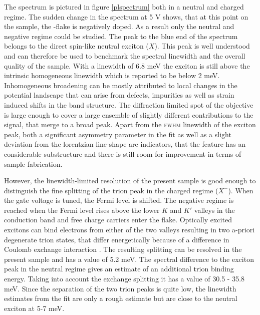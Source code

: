 The \pl spectrum is pictured in figure \ref{plspectrum} both in a neutral and charged regime. The sudden change in the spectrum at 5 V shows, that at this point on the sample, the \tmd-flake is negatively doped. As a result only the neutral and negative regime could be studied. The peak to the blue end of the spectrum belongs to the direct spin-like neutral exciton ($X$). This peak is well understood and can therefore be used to benchmark the spectral linewidth and the overall quality of the sample. With a linewidth of 6.8 meV the exciton is still above the intrinsic homogeneous linewidth which is reported to be below 2 meV\cite{moody_intrinsic_2015, ajayi_approaching_2017}. Inhomogeneous broadening can be mostly attributed to local changes in the potential landscape that can arise from defects, impurities as well as strain induced shifts in the band structure\cite{zhu_strain_2013}. The diffraction limited spot of the objective is large enough to cover a large ensemble of slightly different contributions to the \pl signal, that merge to a broad peak. Apart from the \textsc{fwhm} linewidth of the exciton peak, both a significant asymmetry parameter in the fit as well as a slight deviation from the lorentzian line-shape are indicators, that the feature has an considerable substructure and there is still room for improvement in terms of sample fabrication.

However, the linewidth-limited resolution of the present sample is good enough to distinguish the fine splitting of the trion peak in the charged regime ($X^-$). When the gate voltage is tuned, the Fermi level is shifted. The negative regime is reached when the Fermi level rises above the lower $K$ and $K'$ valleys in the conduction band and free charge carriers enter the flake. Optically excited excitons can bind electrons from either of the two valleys resulting in two a-priori degenerate trion states, that differ energetically because of a difference in Coulomb exchange interaction \cite{courtade_charged_2017}. The resulting splitting can be resolved in the present sample and has a value of 5.2 meV. The spectral difference to the exciton peak in the neutral regime gives an estimate of an additional trion binding energy. Taking into account the exchange splitting it has a value of 30.5 - 35.8 meV. Since the separation of the two trion peaks is quite low, the linewidth estimates from the fit are only a rough estimate but are close to the neutral exciton at 5-7 meV.

